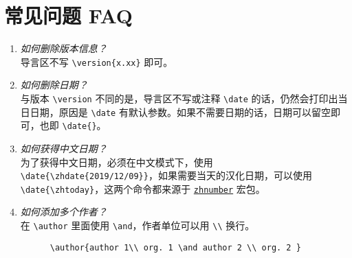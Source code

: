 \documentclass[cn,geye,blue,14pt,normal]{elegantnote}
\begin{document}
\section{常见问题 FAQ}

\begin{enumerate}[label=\arabic*).]
  \item \textit{如何删除版本信息？}\\
        导言区不写 \lstinline|\version{x.xx}| 即可。
  \item \textit{如何删除日期？}\\
        与版本 \lstinline{\version} 不同的是，导言区不写或注释 \lstinline{\date} 的话，仍然会打印出当日日期，原因是 \lstinline{\date} 有默认参数。如果不需要日期的话，日期可以留空即可，也即 \lstinline|\date{}|。
  \item \textit{如何获得中文日期？}\\
        为了获得中文日期，必须在中文模式下，使用 \lstinline|\date{\zhdate{2019/12/09}}|，如果需要当天的汉化日期，可以使用 \lstinline|\date{\zhtoday}|，这两个命令都来源于 \href{https://ctan.org/pkg/zhnumber}{\lstinline{zhnumber}} 宏包。
  \item \textit{如何添加多个作者？}\\
        在 \lstinline{\author} 里面使用 \lstinline{\and}，作者单位可以用 \lstinline{\\} 换行。
        \begin{lstlisting}
      \author{author 1\\ org. 1 \and author 2 \\ org. 2 }
    \end{lstlisting}
\end{enumerate}
\end{document}
